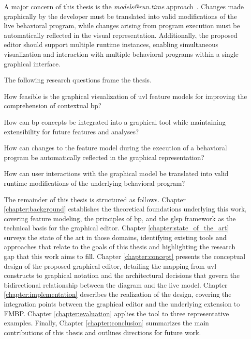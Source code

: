 A major concern of this thesis is the \textit{models@run.time} approach~\cite{blair_models_2009}.
Changes made graphically by the developer must be translated into valid modifications of the live behavioral program, while changes arising from program execution must be automatically reflected in the visual representation.
Additionally, the proposed editor should support multiple runtime instances, enabling simultaneous visualization and interaction with multiple behavioral programs within a single graphical interface.

The following research questions frame the thesis.
\begin{description}[leftmargin=1.5cm, labelwidth=1.3cm, labelsep=0.2cm]
    \item[\textbf{RQ1}]
    How feasible is the graphical visualization of \gls{uvl} feature models for improving the comprehension of contextual \gls{bp}?
    \item[\textbf{RQ2}]
    How can \gls{bp} concepts be integrated into a graphical tool while maintaining extensibility for future features and analyses?
    \item[\textbf{RQ3.1}]
    How can changes to the feature model during the execution of a behavioral program be automatically reflected in the graphical representation?
    \item[\textbf{RQ3.2}]
    How can user interactions with the graphical model be translated into valid runtime modifications of the underlying behavioral program?
\end{description}

The remainder of this thesis is structured as follows.
Chapter \ref{chapter:background} establishes the theoretical foundations underlying this work, covering feature modeling, the principles of \gls{bp}, and the \gls{glsp} framework as the technical basis for the graphical editor.
Chapter \ref{chapter:state_of_the_art} surveys the state of the art in those domains, identifying existing tools and approaches that relate to the goals of this thesis and highlighting the research gap that this work aims to fill.
Chapter \ref{chapter:concept} presents the conceptual design of the proposed graphical editor, detailing the mapping from \gls{uvl} constructs to graphical notation and the architectural decisions that govern the bidirectional relationship between the diagram and the live model.
Chapter \ref{chapter:implementation} describes the realization of the design, covering the integration points between the graphical editor and the underlying extension to FMBP.
Chapter \ref{chapter:evaluation} applies the tool to three representative examples.
Finally, Chapter \ref{chapter:conclusion} summarizes the main contributions of this thesis and outlines directions for future work.